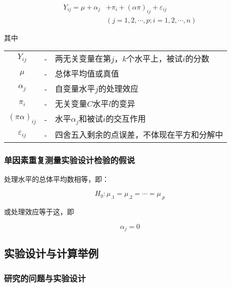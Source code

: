 \begin{definition}[单因素被试设计模型]
    \begin{align*}
        Y_{ij} = \mu + \alpha _j & + \pi _i + \left( \alpha \pi \right)_{ij} +  \varepsilon _{ij}\\
                                   &\left( j=1, 2, \cdots ,p; i=1,2, \cdots , n \right)
    \end{align*}
    
    其中
    
    {
    \renewcommand\arraystretch{1.25}
    \begin{tabular}{ccl}
        $Y_{ij}$             & - &    两无关变量在第$j，k$个水平上，被试$i$的分数\\ 
        $\mu$                & - &    总体平均值或真值\\
        $\alpha _j$          & - &    自变量水平$j$的处理效应\\
        $\pi _i$             & - &    无关变量$C$水平$l$的变异\\
        $\left( \pi  \alpha \right)_{ij}$ &-& 水平$\alpha _j$和被试$i$的交互作用\\
        $\varepsilon _{ij}$  & - &    四舍五入剩余的点误差，不体现在平方和分解中
    \end{tabular}
}  
\end{definition}

\subsubsection{单因素重复测量实验设计检验的假说}

处理水平的总体平均数相等，即：

\[ H_0 : \mu _{.1} = \mu _{.2} = \cdots = \mu _{.p}  \]

或处理效应等于这，即

\[ \alpha _j = 0 \]

\subsection{实验设计与计算举例}
\subsubsection{研究的问题与实验设计}


